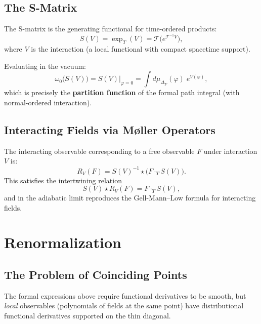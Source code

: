 \documentclass[11pt,a4paper]{article}
\begin{document}
\subsection{The S-Matrix}

The S-matrix is the generating functional for time-ordered products:
\begin{equation}
  S(V) = \exp_T(V) = \mathcal{T}\bigl(e^{\mathcal{T}^{-1}V}\bigr),
\end{equation}
where $V$ is the interaction (a local functional with compact spacetime support).

Evaluating in the vacuum:
\begin{equation}
  \omega_0\bigl(S(V)\bigr) = S(V)\big|_{\varphi=0}
  = \int d\mu_{\Delta_F}(\varphi)\; e^{V(\varphi)},
\end{equation}
which is precisely the \textbf{partition function} of the formal path integral
(with normal-ordered interaction).

\subsection{Interacting Fields via M\o ller Operators}

The interacting observable corresponding to a free observable $F$ under
interaction $V$ is:
\begin{equation}
  R_V(F) = S(V)^{-1} \star \bigl(F \cdot_T S(V)\bigr).
\end{equation}
This satisfies the intertwining relation
\[
  S(V) \star R_V(F) = F \cdot_T S(V),
\]
and in the adiabatic limit reproduces the Gell-Mann--Low formula for
interacting fields.

\section{Renormalization}

\subsection{The Problem of Coinciding Points}

The formal expressions above require functional derivatives to be smooth,
but \emph{local} observables (polynomials of fields at the same point)
have distributional functional derivatives supported on the thin diagonal.
\end{document}
